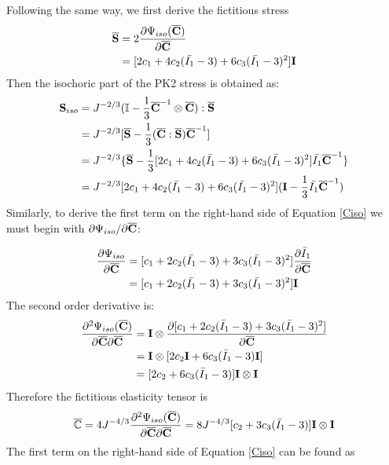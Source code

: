 Following the same way, we first derive the fictitious stress
\begin{equation} \label{Sbar2}
\begin{split}
\overline{\bold{S}} &= 2\frac{\partial\Psi_{iso}({\overline{\bold{C}})}}{\partial\overline{\bold{C}}} \\
&= [2c_1 + 4c_2(\bar{I_1} - 3) + 6c_3(\bar{I_1} - 3)^2] \bold{I} \\
\end{split}
\end{equation}
Then the isochoric part of the PK2 stress is obtained as:
\begin{equation} \label{Siso2}
\begin{split}
{\bold{S}}_{iso} &= J^{-2/3}(\mathbb{I} - \frac{1}{3}{\overline{\bold{C}}}^{-1} \otimes \overline{\bold{C}}) : \overline{\bold{S}}\\
&= J^{-2/3}[\overline{\bold{S}} - \frac{1}{3} (\overline{\bold{C}} : \overline{\bold{S}}) \overline{\bold{C}}^{-1}  ] \\
&= J^{-2/3}\{\overline{\bold{S}} - \frac{1}{3} [2c_1 + 4c_2(\bar{I_1} - 3) + 6c_3(\bar{I_1} - 3)^2] \bar{I_1}\overline{\bold{C}}^{-1} \}\\
&= J^{-2/3}[2c_1 + 4c_2(\bar{I_1} - 3) + 6c_3(\bar{I_1} - 3)^2] (\bold{I} - \frac{1}{3}\bar{I_1}{\overline{\bold{C}}}^{-1})
\end{split}
\end{equation}
Similarly, to derive the first term on the right-hand side of Equation \ref{Ciso} we must begin with $\partial{\Psi_{iso}}/\partial{\overline{\bold{C}}}$:

\begin{equation}
\begin{split}
\frac{\partial{\Psi_{iso}}}{\partial{\overline{\bold{C}}}} 
&= [c_1 + 2c_2(\bar{I_1} - 3) + 3c_3(\bar{I_1} - 3)^2] \frac{\partial{\bar{I}_1}}{\partial{\overline{\bold{C}}}} \\
&= [c_1 + 2c_2(\bar{I_1} - 3) + 3c_3(\bar{I_1} - 3)^2] \bold{I} 
\end{split}
\end{equation}
The second order derivative is:
\begin{equation}
\begin{split}
\frac{\partial^2\Psi_{iso}(\overline{\bold{C}})}{\partial\overline{\bold{C}}\partial\overline{\bold{C}}} &= 
\bold{I} \otimes \frac{\partial[c_1 + 2c_2({\bar{I}}_1-3) + 3c_3({\bar{I}}_1-3)^2 ]}{\partial{\overline{\bold{C}}}} \\
&= \bold{I} \otimes [2c_2\bold{I} + 6c_3({\bar{I}}_1-3)\bold{I}]\\
&= [2c_2 + 6c_3({\bar{I}}_1-3)] \bold{I} \otimes \bold{I}
\end{split}
\end{equation}
Therefore the fictitious elasticity tensor is
\begin{equation}
\overline{\mathbb{C}} = 4J^{-4/3}\frac{\partial^2\Psi_{iso}(\overline{\bold{C}})}{\partial{\overline{\bold{C}}}{\partial{\overline{\bold{C}}}}} = 8J^{-4/3}[c_2 + 3c_3({\bar{I}}_1 - 3) ]\bold{I} \otimes \bold{I}
\end{equation}
The first term on the right-hand side of Equation \ref{Ciso} can be found as

